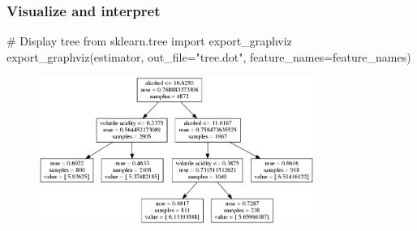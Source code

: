 \documentclass{beamer}
\begin{document}
\begin{frame}[fragile]
\frametitle{Visualize and interpret}

{\footnotesize
\begin{pythoncode}
# Display tree
from sklearn.tree import export_graphviz
export_graphviz(estimator, out_file="tree.dot",
                feature_names=feature_names)
\end{pythoncode}
}

\begin{figure}
\includegraphics[width=0.8\textwidth]{./figures/wine-tree.png}
\end{figure}

\end{frame}
\end{document}
